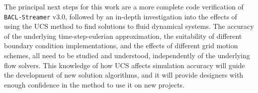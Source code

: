 The principal next steps for this work are a more complete code verification of {\tt BACL-Streamer} v3.0, followed by an in-depth investigation into the effects of using the UCS method to find solutions to fluid dynamical systems. The accuracy of the underlying time-step-eulerian approximation, the suitability of different boundary condition implementations, and the effects of different grid motion schemes, all need to be studied and understood, independently of the underlying flow solvers. This knowledge of how UCS affects simulation accuracy will guide the development of new solution algorithms, and it will provide designers with enough confidence in the method to use it on new projects.

